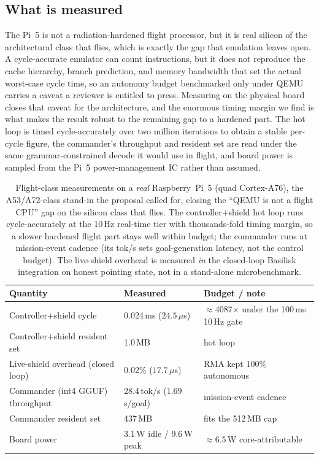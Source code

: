 \documentclass[journal]{IEEEtran}
\begin{document}
\subsection{What is measured} The Pi~5 is not a radiation-hardened flight
processor, but it is real silicon of the architectural class that flies, which is exactly the gap
that emulation leaves open. A cycle-accurate emulator can count instructions, but it does not
reproduce the cache hierarchy, branch prediction, and memory bandwidth that set the actual
worst-case cycle time, so an autonomy budget benchmarked only under QEMU carries a caveat a
reviewer is entitled to press. Measuring on the physical board closes that caveat for the
architecture, and the enormous timing margin we find is what makes the result robust to the
remaining gap to a hardened part. The hot loop is timed cycle-accurately over two million
iterations to obtain a stable per-cycle figure, the commander's throughput and resident set are
read under the same grammar-constrained decode it would use in flight, and board power is sampled
from the Pi~5 power-management IC rather than assumed.

\begin{table}[!t]\centering\small
\caption{Flight-class measurements on a \emph{real} Raspberry~Pi~5 (quad Cortex-A76), the A53/A72-class stand-in the proposal called for, closing the ``QEMU is not a flight CPU'' gap on the silicon class that flies. The controller$+$shield hot loop runs cycle-accurately at the 10\,Hz real-time tier with thousands-fold timing margin, so a slower hardened flight part stays well within budget; the commander runs at mission-event cadence (its tok/s sets goal-generation latency, not the control budget). The live-shield overhead is measured \emph{in} the closed-loop Basilisk integration on honest pointing state, not in a stand-alone microbenchmark.}
\label{tab:flightclass}
\begin{tabular}{lll}
\toprule
Quantity & Measured & Budget / note \\
\midrule
Controller$+$shield cycle & 0.024\,ms ($24.5\,\mu$s) & $\approx$4087$\times$ under the 100\,ms 10\,Hz gate \\
Controller$+$shield resident set & 1.0\,MB & hot loop \\
Live-shield overhead (closed loop) & 0.02\% ($17.7\,\mu$s) & RMA kept 100\% autonomous \\
Commander (int4 GGUF) throughput & 28.4\,tok/s (1.69\,s/goal) & mission-event cadence \\
Commander resident set & 437\,MB & fits the 512\,MB cap \\
Board power & 3.1\,W idle / 9.6\,W peak & $\approx$6.5\,W core-attributable \\
\bottomrule
\end{tabular}
\end{table}
\end{document}

